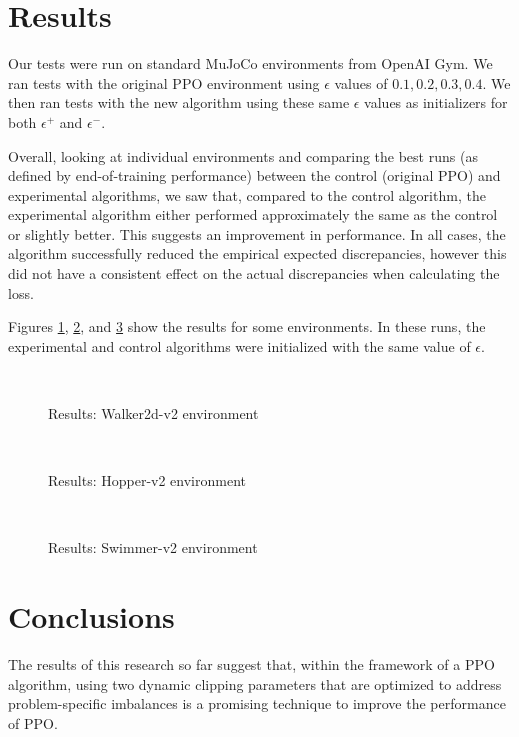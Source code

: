 \documentclass[letterpaper,twocolumn,10pt]{article}
\begin{document}
\section{Results}
Our tests were run on standard MuJoCo environments from OpenAI Gym. We ran
tests with the original PPO environment using $\epsilon$ values of $0.1, 0.2,
0.3, 0.4$. We then ran tests with the new algorithm using these same $\epsilon$
values as initializers for both $\epsilon^+$ and $\epsilon^-$. 

Overall, looking at individual environments and comparing the best runs
(as defined by end-of-training performance) between the control (original
PPO) and experimental algorithms, we saw that, compared to the control
algorithm, the experimental algorithm either performed approximately the same
as the control or slightly better. This suggests an improvement in
performance. In all cases, the algorithm successfully reduced the empirical
expected discrepancies, however this did not have a consistent effect on the
actual discrepancies when calculating the loss.

Figures \ref{fig:2}, \ref{fig:3}, and
\ref{fig:4} show the results for some environments. In these runs, the
experimental and control algorithms were initialized with the same value of
$\epsilon$.
\begin{figure}
    \centering
    \scalebox{0.45}{}\\
    \caption{Results: Walker2d-v2 environment}
    \label{fig:2}
\end{figure}
\begin{figure}
    \centering
    \scalebox{0.45}{}\\
    \caption{Results: Hopper-v2 environment}
    \label{fig:3}
\end{figure}
\begin{figure}
    \centering
    \scalebox{0.45}{}\\
    \caption{Results: Swimmer-v2 environment}
    \label{fig:4}
\end{figure}

\section{Conclusions}
The results of this research so far suggest that, within the framework of a PPO
algorithm, using two dynamic clipping parameters that are optimized to address
problem-specific imbalances is a promising technique to improve the performance
of PPO. 
\end{document}
